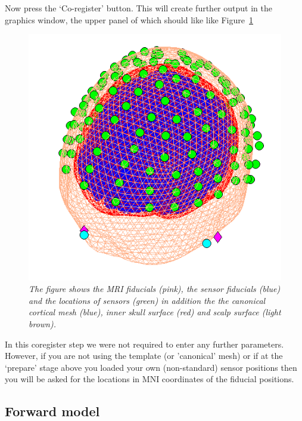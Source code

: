 Now press the `Co-register' button. This will create further output in the graphics window, the upper panel of which should like like Figure~\ref{coreg}
\begin{figure}
\begin{center}
\includegraphics[width=120mm]{mmn/coreg}
\caption{\em
\label{mesh}The figure shows the MRI fiducials (pink), the sensor fiducials (blue) and the locations of sensors (green) in addition the the canonical cortical mesh (blue), inner skull surface (red) and scalp surface (light brown).
\label{coreg}}
\end{center}
\end{figure}

 In this coregister step we were not required to enter any further parameters. However, if you are not using the template (or 'canonical' mesh) or if at the `prepare' stage above you loaded your own (non-standard) sensor positions then you will be asked for the locations in MNI coordinates of the fiducial positions.

\subsection{Forward model}

